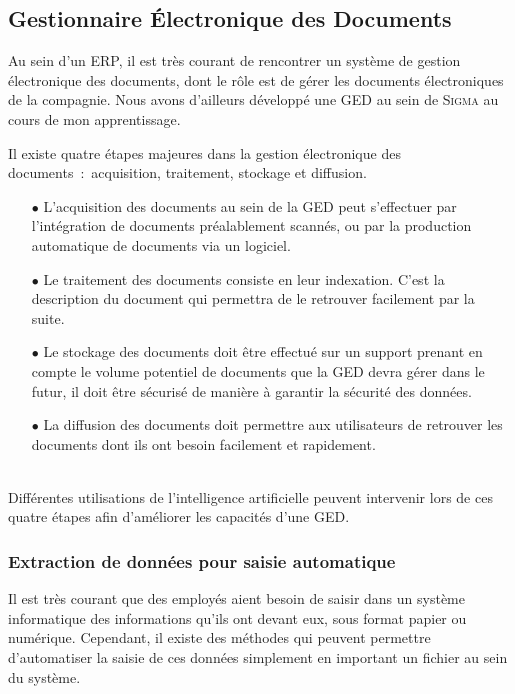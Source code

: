 \subsection{Gestionnaire Électronique des Documents}

Au sein d'un ERP, il est très courant de rencontrer un système de gestion électronique des documents, dont le rôle est de gérer les documents électroniques de la compagnie.
Nous avons d'ailleurs développé une GED au sein de \textsc{Sigma} au cours de mon apprentissage.

Il existe quatre étapes majeures dans la gestion électronique des documents~:~acquisition, traitement, stockage et diffusion.
\\
\begin{itemize}
    \item[\tiny$\bullet$] L'acquisition des documents au sein de la GED peut s'effectuer par l'intégration de documents préalablement scannés, ou par la production automatique de documents via un logiciel.
    \item[\tiny$\bullet$] Le traitement des documents consiste en leur indexation. C'est la description du document qui permettra de le retrouver facilement par la suite.
    \item[\tiny$\bullet$] Le stockage des documents doit être effectué sur un support prenant en compte le volume potentiel de documents que la GED devra gérer dans le futur, il doit être sécurisé de manière à garantir la sécurité des données.
    \item[\tiny$\bullet$] La diffusion des documents doit permettre aux utilisateurs de retrouver les documents dont ils ont besoin facilement et rapidement.
\end{itemize}
~\\

Différentes utilisations de l'intelligence artificielle peuvent intervenir lors de ces quatre étapes afin d'améliorer les capacités d'une GED.





\subsubsection{Extraction de données pour saisie automatique}

Il est très courant que des employés aient besoin de saisir dans un système informatique des informations qu'ils ont devant eux, sous format papier ou numérique.
Cependant, il existe des méthodes qui peuvent permettre d'automatiser la saisie de ces données simplement en important un fichier au sein du système.


